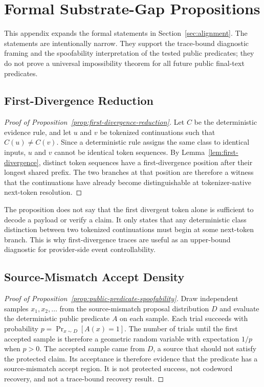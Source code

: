 \section{Formal Substrate-Gap Propositions}
\label{app:formal-substrate-gap}

This appendix expands the formal statements in
Section~\ref{sec:alignment}.  The statements are intentionally narrow.  They
support the trace-bound diagnostic framing and the spoofability interpretation
of the tested public predicates; they do not prove a universal impossibility
theorem for all future public final-text predicates.

\subsection{First-Divergence Reduction}

\begin{proof}[Proof of Proposition~\ref{prop:first-divergence-reduction}]
Let $C$ be the deterministic evidence rule, and let $u$ and $v$ be tokenized
continuations such that $C(u)\neq C(v)$.  Since a deterministic rule assigns
the same class to identical inputs, $u$ and $v$ cannot be identical token
sequences.  By Lemma~\ref{lem:first-divergence}, distinct token sequences have
a first-divergence position after their longest shared prefix.  The two
branches at that position are therefore a witness that the continuations have
already become distinguishable at tokenizer-native next-token resolution.
\end{proof}

The proposition does not say that the first divergent token alone is sufficient
to decode a payload or verify a claim.  It only states that any deterministic
class distinction between two tokenized continuations must begin at some
next-token branch.  This is why first-divergence traces are useful as an
upper-bound diagnostic for provider-side event controllability.

\subsection{Source-Mismatch Accept Density}

\begin{proof}[Proof of Proposition~\ref{prop:public-predicate-spoofability}]
Draw independent samples $x_1,x_2,\ldots$ from the source-mismatch proposal
distribution $D$ and evaluate the deterministic public predicate $A$ on each
sample.  Each trial succeeds with probability
$p=\Pr_{x\sim D}[A(x)=1]$.  The number of trials until the first accepted sample
is therefore a geometric random variable with expectation $1/p$ when $p>0$.
The accepted sample came from $D$, a source that should not satisfy the
protected claim.  Its acceptance is therefore evidence that the predicate has a
source-mismatch accept region.  It is not protected success, not codeword
recovery, and not a trace-bound recovery result.
\end{proof}

